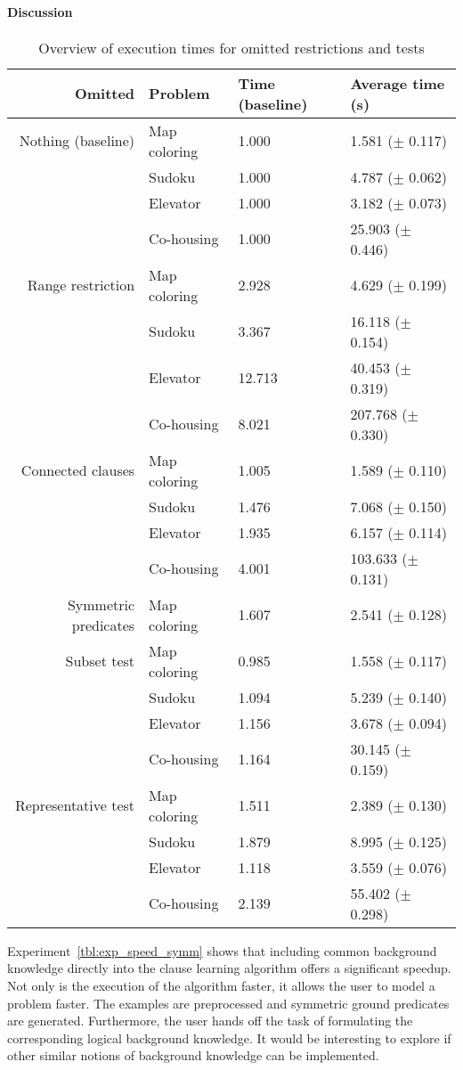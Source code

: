 \paragraph{Discussion}
\begin{table}
	\begin{tabularx}{\textwidth}{rl|XX}

\textbf{Omitted}	& \textbf{Problem} 		& \textbf{Time (baseline)}	& \textbf{Average time (s)}\\
\toprule
Nothing (baseline)		& Map coloring 	& 1.000 	& 1.581		($\pm$ 0.117)\\
						& Sudoku 		& 1.000 	& 4.787		($\pm$ 0.062)\\
						& Elevator 		& 1.000 	& 3.182 	($\pm$ 0.073)\\
						& Co-housing 	& 1.000 	& 25.903	($\pm$ 0.446)\\
\midrule
Range restriction 		& Map coloring 	& 2.928		& 4.629		($\pm$ 0.199)\\
						& Sudoku 		& 3.367		& 16.118	($\pm$ 0.154)\\
						& Elevator 		& 12.713	& 40.453 	($\pm$ 0.319)\\
						& Co-housing 	& 8.021		& 207.768	($\pm$ 0.330)\\
\midrule
Connected clauses 		& Map coloring 	& 1.005		& 1.589		($\pm$ 0.110)\\
						& Sudoku 		& 1.476		& 7.068		($\pm$ 0.150)\\
						& Elevator 		& 1.935		& 6.157 	($\pm$ 0.114)\\
						& Co-housing 	& 4.001		& 103.633	($\pm$ 0.131)\\
\midrule
Symmetric predicates	& Map coloring 	& 1.607		& 2.541		($\pm$ 0.128)\\
\midrule
Subset test 			& Map coloring 	& 0.985		& 1.558		($\pm$ 0.117)\\
						& Sudoku 		& 1.094		& 5.239		($\pm$ 0.140)\\
						& Elevator 		& 1.156		& 3.678 	($\pm$ 0.094)\\
						& Co-housing 	& 1.164		& 30.145	($\pm$ 0.159)\\
\midrule
Representative test 	& Map coloring 	& 1.511		& 2.389		($\pm$ 0.130)\\
						& Sudoku 		& 1.879		& 8.995		($\pm$ 0.125)\\
						& Elevator 		& 1.118		& 3.559 	($\pm$ 0.076)\\
						& Co-housing 	& 2.139		& 55.402	($\pm$ 0.298)\\
	\end{tabularx}
	\caption{Overview of execution times for omitted restrictions and tests}
	\label{tbl:speed_results}
\end{table}
Experiment~\ref{tbl:exp_speed_symm} shows that including common background knowledge directly into the clause learning algorithm offers a significant speedup.
Not only is the execution of the algorithm faster, it allows the user to model a problem faster.
The examples are preprocessed and symmetric ground predicates are generated.
Furthermore, the user hands off the task of formulating the corresponding logical background knowledge.
It would be interesting to explore if other similar notions of background knowledge can be implemented.

